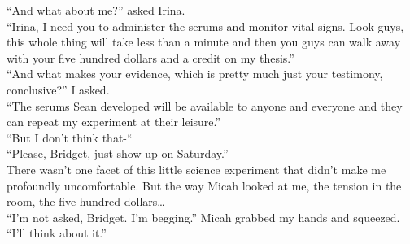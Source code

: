 \documentclass[a5paper]{scrartcl}
\def\asterism{\par\vspace{1em}{\centering\scalebox{1.5}{%
  \stackon[-0.5pt]{\bfseries*~*}{\bfseries*}}\par}\vspace{.5em}\par}
\begin{document}
\enquote{And what about me?} asked Irina.\\
\enquote{Irina, I need you to administer the serums and monitor vital signs. Look guys, this whole thing will take less than a minute and then you guys can walk away with your five hundred dollars and a credit on my thesis.}\\
\enquote{And what makes your evidence, which is pretty much just your testimony, conclusive?} I asked.\\
\enquote{The serums Sean developed will be available to anyone and everyone and they can repeat my experiment at their leisure.}\\
“But I don’t think that-“\\
\enquote{Please, Bridget, just show up on Saturday.}\\
There wasn't one facet of this little science experiment that didn't make me profoundly uncomfortable. But the way Micah looked at me, the tension in the room, the five hundred dollars\dots\\
\enquote{I'm not asked, Bridget. I'm begging.} Micah grabbed my hands and squeezed.\\
\enquote{I'll think about it.}

\asterism
\end{document}

